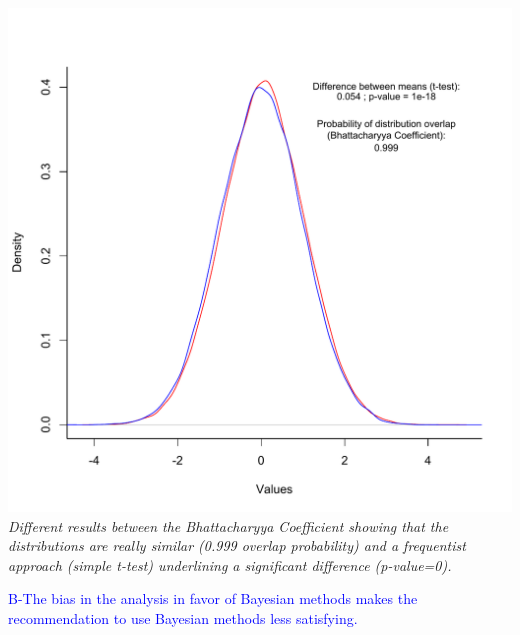 \documentclass[11pt]{letter}
\begin{document}
\begin{letter}{}
\includegraphics[scale=0.8, keepaspectratio=true]{Comparing_distributions.pdf} \\
\textit{Different results between the Bhattacharyya Coefficient showing that the distributions are really similar (0.999 overlap probability) and a frequentist approach (simple t-test) underlining a significant difference (p-value=0).}




\textcolor{blue}{B-The bias in the analysis in favor of Bayesian methods makes the recommendation to use Bayesian methods less satisfying.}


\end{letter}
\end{document}
